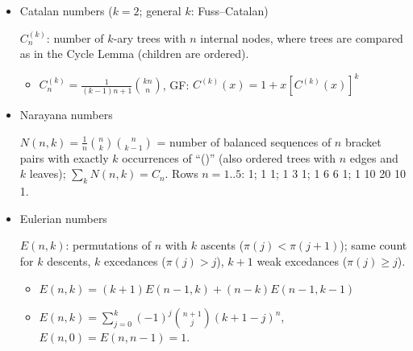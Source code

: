 \begin{itemize}
\item Catalan numbers ($k = 2$; general $k$: Fuss--Catalan)

$C^{(k)}_n$: number of $k$-ary trees with $n$ internal nodes, where trees are compared as in the Cycle Lemma (children are ordered).

\begin{itemize}
  \item $C^{(k)}_n = \frac{1}{(k - 1)n + 1}\binom{kn}{n}$, \quad GF: $C^{(k)}(x) = 1 + x [C^{(k)}(x)]^k$
\end{itemize}

\item Narayana numbers

$N(n, k) = \frac{1}{n} \binom{n}{k} \binom{n}{k-1}$ = number of balanced sequences of $n$ bracket pairs with exactly $k$ occurrences of ``()'' (also ordered trees with $n$ edges and $k$ leaves); $\sum_k N(n, k) = C_n$. Rows $n = 1..5$: 1; 1 1; 1 3 1; 1 6 6 1; 1 10 20 10 1.

\item Eulerian numbers

$E(n, k)$: permutations of $n$ with $k$ ascents ($\pi(j) < \pi(j+1)$); same count for $k$ descents, $k$ excedances ($\pi(j) > j$), $k+1$ weak excedances ($\pi(j) \ge j$).
\begin{itemize}
  \item $E(n,k) = (k+1)E(n-1,k) + (n-k)E(n-1,k-1)$
  \item $E(n,k) = \sum_{j=0}^{k} (-1)^j \binom{n+1}{j} (k+1-j)^n$, $E(n,0) = E(n,n-1) = 1$.
\end{itemize}

\end{itemize}
